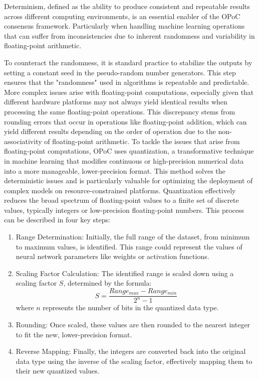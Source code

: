 \documentclass{article}
\begin{document}
Determinism, defined as the ability to produce consistent and repeatable results across different computing environments, is an essential enabler of the OPoC consensus framework. Particularly when handling machine learning operations that can suffer from inconsistencies due to inherent randomness and variability in floating-point arithmetic.

To counteract the randomness, it is standard practice to stabilize the outputs by setting a constant seed in the pseudo-random number generators. This step ensures that the "randomness" used in algorithms is repeatable and predictable. 
More complex issues arise with floating-point computations, especially given that different hardware platforms may not always yield identical results when processing the same floating-point operations. This discrepancy stems from rounding errors that occur in operations like floating-point addition, which can yield different results depending on the order of operation due to the non-associativity of floating-point arithmetic.    
To tackle the issues that arise from floating-point computations, OPoC uses quantization, a transformative technique in machine learning that modifies continuous or high-precision numerical data into a more manageable, lower-precision format. This method solves the deterministic issues and is particularly valuable for optimizing the deployment of complex models on resource-constrained platforms.
Quantization effectively reduces the broad spectrum of floating-point values to a finite set of discrete values, typically integers or low-precision floating-point numbers. This process can be described in four key steps:

\begin{enumerate}


\item Range Determination: Initially, the full range of the dataset, from minimum to maximum values, is identified. This range could represent the values of neural network parameters like weights or activation functions.
\item Scaling Factor Calculation: The identified range is scaled down using a scaling factor \( S \), determined by the formula:
   \[
   S = \frac{Range_{max} - Range_{min}}{2^n - 1}
   \]
   where \( n \) represents the number of bits in the quantized data type.
\item Rounding: Once scaled, these values are then rounded to the nearest integer to fit the new, lower-precision format.
\item Reverse Mapping: Finally, the integers are converted back into the original data type using the inverse of the scaling factor, effectively mapping them to their new quantized values.
\end{enumerate}
\end{document}

